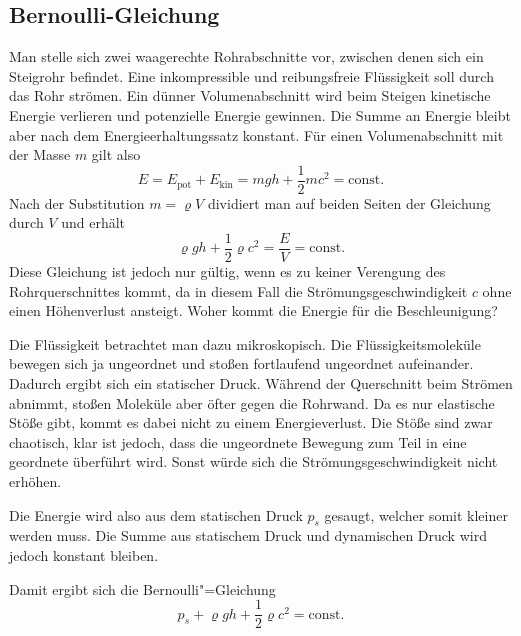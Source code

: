 \documentclass[a4paper,11pt,fleqn,twocolumn,twoside,dvipdfmx]{scrartcl}
\begin{document}
\subsection{Bernoulli-Gleichung}

Man stelle sich zwei waagerechte Rohrabschnitte vor, zwischen denen
sich ein Steigrohr befindet. Eine inkompressible und reibungsfreie
Flüssigkeit soll durch das Rohr strömen. Ein dünner Volumenabschnitt
wird beim Steigen kinetische Energie verlieren und potenzielle Energie
gewinnen. Die Summe an Energie bleibt aber nach dem Energieerhaltungssatz
konstant. Für einen Volumenabschnitt mit der Masse $m$ gilt also%
\[E=E_\mathrm{pot}+E_\mathrm{kin}
=mgh+\frac{1}{2}mc^2=\mathrm{const}.\]
Nach der Substitution $m=\varrho V$ dividiert
man auf beiden Seiten der Gleichung durch $V$ und erhält%
\[\varrho gh+\frac{1}{2}\varrho c^2=\frac{E}{V}=\mathrm{const}.\]
Diese Gleichung ist jedoch nur gültig, wenn es zu keiner
Verengung des Rohrquerschnittes kommt, da in diesem Fall die
Strömungsgeschwindigkeit $c$ ohne einen Höhenverlust ansteigt.
Woher kommt die Energie für die Beschleunigung?

Die Flüssigkeit betrachtet man dazu mikroskopisch.
Die Flüssigkeitsmoleküle bewegen sich ja ungeordnet und stoßen
fortlaufend ungeordnet aufeinander. Dadurch ergibt sich ein
statischer Druck. Während der Querschnitt beim Strömen abnimmt,
stoßen Moleküle aber öfter gegen die Rohrwand. Da es nur
elastische Stöße gibt, kommt es dabei nicht zu einem Energieverlust.
Die Stöße sind zwar chaotisch, klar ist jedoch, dass die ungeordnete
Bewegung zum Teil in eine geordnete überführt wird. Sonst würde
sich die Strömungsgeschwindigkeit nicht erhöhen.

Die Energie wird also aus dem statischen Druck $p_s$ gesaugt,
welcher somit kleiner werden muss. Die Summe aus statischem
Druck und dynamischen Druck wird jedoch konstant bleiben.

Damit ergibt sich die Bernoulli"=Gleichung%
\[p_s+\varrho gh+\frac{1}{2}\varrho c^2 = \mathrm{const}.\]
\end{document}
